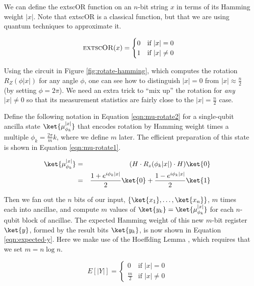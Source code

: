 We can define the 	extsc{OR} function on an $n$-bit string $x$ in terms of
its Hamming weight
$|x|$. Note that 	extsc{OR} is a classical function, but that we are using quantum
techniques to approximate it.

\begin{equation}
\textsc{	extsc{OR}}(x) =
\begin{cases}
0 & \text{if } |x| = 0\\
1 & \text{if } |x| \ne 0
\end{cases}
\end{equation}

Using the circuit in Figure \ref{fig:rotate-hamming}, which computes the
rotation $R_Z(\phi|x|)$ for any angle $\phi$,
one can see how to distinguish $|x|=0$ from
$|x| \approx \frac{n}{2}$ (by setting $\phi=2\pi$).
We need an extra trick to ``mix up'' the
rotation for \emph{any} $|x| \ne 0$ so that its measurement statistics are fairly
close to the $|x| = \frac{n}{2}$ case.

Define the following notation in Equation \ref{eqn:mu-rotate2}
for a single-qubit ancilla state $\ket{\mu^{|x|}_{\phi_k}}$ that
encodes rotation by Hamming weight times a multiple $\phi_k = \frac{2\pi}{m}k$,
where we define $m$ later.
The efficient
preparation of this state is shown in Equation \ref{eqn:mu-rotate1}.

\begin{eqnarray}
\label{eqn:mu-rotate1}
\ket{\mu^{|x|}_{\phi_k}} & = & (H \cdot R_z(\phi_k|x|) \cdot H) \ket{0} \\
                         & = &
\label{eqn:mu-rotate2}
\frac{1 + e^{i\phi_k|x|}}{2}\ket{0} + \frac{1 - e^{i\phi_k|x|}}{2}\ket{1}
\end{eqnarray}

Then we fan out the $n$ bits of our input, $\{\ket{x_1}, \ldots, \ket{x_n}\}$,
$m$ times each into ancillae, and compute $m$ values of
$\ket{y_k} = \ket{\mu^{|x|}_{\phi_k}}$ for each $n$-qubit block of ancillae.
The expected Hamming weight of this new $m$-bit register $\ket{y}$, formed by
the result bits $\ket{y_k}$, is now shown in Equation \ref{eqn:expected-y}.
Here we make use of the Hoeffding Lemma \cite{Hoeffding1963},
which requires that we set
$m = n \log n$.

\begin{equation}
\label{eqn:expected-y}
E[|Y|] =
\begin{cases}
0 & \text{if } |x| = 0\\
\frac{m}{2} & \text{if } |x| \ne 0
\end{cases}
\end{equation}

